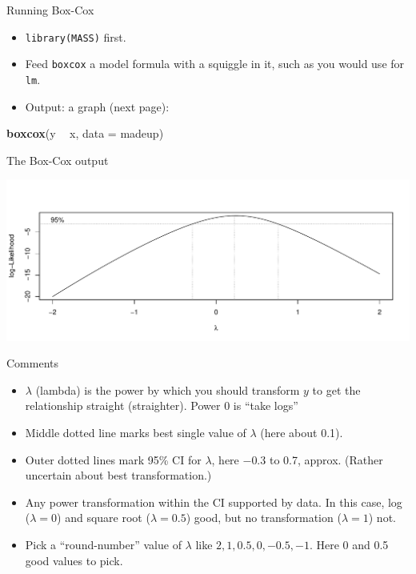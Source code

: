 \documentclass[
  ignorenonframetext,
]{beamer}
\newenvironment{Shaded}{\begin{snugshade}}{\end{snugshade}}
\newcommand{\DataTypeTok}[1]{\textcolor[rgb]{0.13,0.29,0.53}{#1}}
\newcommand{\KeywordTok}[1]{\textcolor[rgb]{0.13,0.29,0.53}{\textbf{#1}}}
\newcommand{\NormalTok}[1]{#1}
\newcommand{\OperatorTok}[1]{\textcolor[rgb]{0.81,0.36,0.00}{\textbf{#1}}}
\newcommand{\StringTok}[1]{\textcolor[rgb]{0.31,0.60,0.02}{#1}}
\begin{document}
\begin{frame}[fragile]{Running Box-Cox}
\protect\hypertarget{running-box-cox}{}

\begin{itemize}
\item
  \texttt{library(MASS)} first.
\item
  Feed \texttt{boxcox} a model formula with a squiggle in it, such as
  you would use for \texttt{lm}.
\item
  Output: a graph (next page):
\end{itemize}

\begin{Shaded}
\begin{Highlighting}[]
\KeywordTok{boxcox}\NormalTok{(y }\OperatorTok{~}\StringTok{ }\NormalTok{x, }\DataTypeTok{data =}\NormalTok{ madeup)}
\end{Highlighting}
\end{Shaded}

\end{frame}

\begin{frame}{The Box-Cox output}
\protect\hypertarget{the-box-cox-output}{}

\includegraphics{slides_d29_files/figure-beamer/trento-1.pdf}

\end{frame}

\begin{frame}{Comments}
\protect\hypertarget{comments-3}{}

\begin{itemize}
\item
  \(\lambda\) (lambda) is the power by which you should transform \(y\)
  to get the relationship straight (straighter). Power 0 is ``take
  logs''
\item
  Middle dotted line marks best single value of \(\lambda\) (here about
  0.1).
\item
  Outer dotted lines mark 95\% CI for \(\lambda\), here \(-0.3\) to 0.7,
  approx. (Rather uncertain about best transformation.)
\item
  Any power transformation within the CI supported by data. In this
  case, log (\(\lambda=0\)) and square root (\(\lambda=0.5\)) good, but
  no transformation (\(\lambda=1\)) not.
\item
  Pick a ``round-number'' value of \(\lambda\) like
  \(2,1,0.5,0,-0.5,-1\). Here 0 and 0.5 good values to pick.
\end{itemize}

\end{frame}
\end{document}
